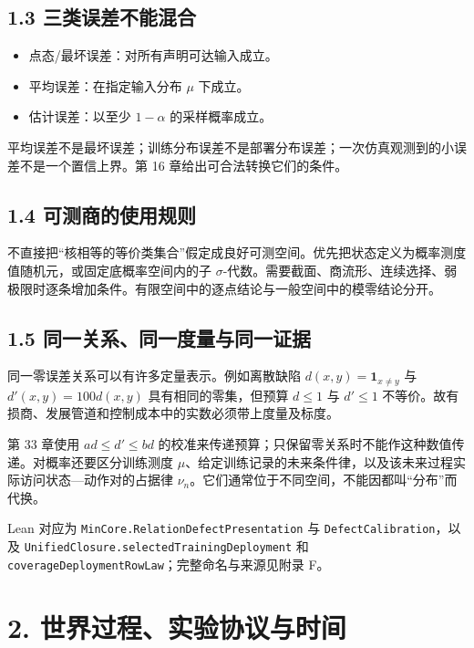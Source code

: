 \documentclass[
  11pt,
  oneside]{book}
\providecommand{\tightlist}{%
  \setlength{\itemsep}{0pt}\setlength{\parskip}{0pt}}
\begin{document}
\section{1.3 三类误差不能混合}\label{ux4e09ux7c7bux8befux5deeux4e0dux80fdux6df7ux5408}

\begin{itemize}
\tightlist
\item
  点态/最坏误差：对所有声明可达输入成立。
\item
  平均误差：在指定输入分布 \(\mu\) 下成立。
\item
  估计误差：以至少 \(1-\alpha\) 的采样概率成立。
\end{itemize}

平均误差不是最坏误差；训练分布误差不是部署分布误差；一次仿真观测到的小误差不是一个置信上界。第 16 章给出可合法转换它们的条件。

\section{1.4 可测商的使用规则}\label{ux53efux6d4bux5546ux7684ux4f7fux7528ux89c4ux5219}

不直接把``核相等的等价类集合''假定成良好可测空间。优先把状态定义为概率测度值随机元，或固定底概率空间内的子 \(\sigma\)-代数。需要截面、商流形、连续选择、弱极限时逐条增加条件。有限空间中的逐点结论与一般空间中的模零结论分开。

\section{1.5 同一关系、同一度量与同一证据}\label{ux540cux4e00ux5173ux7cfbux540cux4e00ux5ea6ux91cfux4e0eux540cux4e00ux8bc1ux636e}

同一零误差关系可以有许多定量表示。例如离散缺陷 \(d(x,y)=\mathbf1_{x\ne y}\) 与 \(d'(x,y)=100d(x,y)\) 具有相同的零集，但预算 \(d\le1\) 与 \(d'\le1\) 不等价。故有损商、发展管道和控制成本中的实数必须带上度量及标度。

第 33 章使用 \(a d\le d'\le b d\) 的校准来传递预算；只保留零关系时不能作这种数值传递。对概率还要区分训练测度 \(\mu\)、给定训练记录的未来条件律，以及该未来过程实际访问状态---动作对的占据律 \(\nu_n\)。它们通常位于不同空间，不能因都叫``分布''而代换。

Lean 对应为 \nolinkurl{MinCore.RelationDefectPresentation} 与 \nolinkurl{DefectCalibration}，以及 \nolinkurl{UnifiedClosure.selectedTrainingDeployment} 和 \nolinkurl{coverageDeploymentRowLaw}；完整命名与来源见附录 F。

\chapter{2. 世界过程、实验协议与时间}\label{ch-2}
\end{document}
